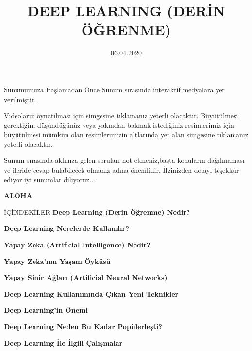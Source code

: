 \documentclass{beamer}                                                                                          %
\title[\color{myred1}Deep Learning]{DEEP LEARNING (DERİN ÖĞRENME)} %
\institute[ALOHA]{}%
\date{06.04.2020} %
\begin{document}
    \begin{frame}
	    \titlepage
   \end{frame}
\begin{frame}{Sunumumuza Başlamadan Önce}
    \centering
    \color{myred1} \color{black}Sunum sırasında interaktif medyalara yer verilmiştir.\par \vspace{10}
    Videoların oynatılması için \color{myred1}  \color{black}simgesine tıklamanız yeterli olacaktır.
    Büyütülmesi gerektiğini düşündüğünüz veya yakından bakmak istediğiniz resimlerimiz için büyütülmesi mümkün olan resimlerimizin altlarında yer alan   \color{myred1} \color{black}simgesine tıklamanız yeterli olacaktır.\par \vspace{10}
    Sunum sırasında aklınıza gelen soruları not etmeniz,başta konuların dağılmaması ve ileride cevap bulabilecek olmanız adına önemlidir.  İlginizden dolayı teşekkür ediyor iyi sunumlar diliyoruz... \color{myred1} \color{black}\par \vspace{15} \textbf{\color{myred1} \huge ALOHA\color{black}}
    
\end{frame}
	\begin{frame}{İÇİNDEKİLER}
	        \color{myred1} \color{black}\textbf{Deep Learning (Derin Öğrenme) Nedir?} \par \vspace{5}
	        \color{myred1} \color{black}\textbf{Deep Learning Nerelerde Kullanılır?} \par \vspace{5}
    	    \color{myred1} \color{black}\textbf{Yapay Zeka (Artificial Intelligence) Nedir?} \par \vspace{5}
    	    \color{myred1} \color{black}\textbf{Yapay Zeka'nın Yaşam Öyküsü} \par \vspace{5}
    	    \color{myred1} \color{black}\textbf{Yapay Sinir Ağları (Artificial Neural Networks)} \par \vspace{5}
    	    \color{myred1} \color{black}\textbf{Deep Learning Kullanımında Çıkan Yeni Teknikler} \par \vspace{5}
    	    \color{myred1} \color{black}\textbf{Deep Learning'in Önemi} \par \vspace{5}
    	    \color{myred1} \color{black}\textbf{Deep Learning Neden Bu Kadar Popülerleşti?} \par \vspace{5}
    	    \color{myred1} \color{black}\textbf{Deep Learning İle İlgili Çalışmalar}
	\end{frame}
    
\end{document}
